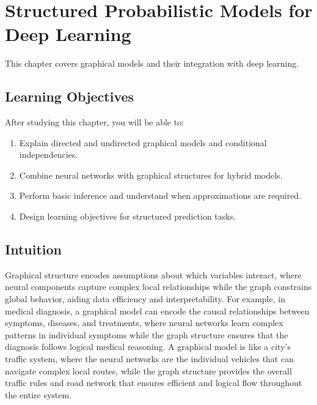 
\chapter{Structured Probabilistic Models for Deep Learning}
\label{chap:structured-probabilistic-models}

This chapter covers graphical models and their integration with deep learning.


\section*{Learning Objectives}

After studying this chapter, you will be able to:

\begin{enumerate}
    \item Explain directed and undirected graphical models and conditional independencies.
    \item Combine neural networks with graphical structures for hybrid models.
    \item Perform basic inference and understand when approximations are required.
    \item Design learning objectives for structured prediction tasks.
\end{enumerate}



\section*{Intuition}

Graphical structure encodes assumptions about which variables interact, where neural components capture complex local relationships while the graph constrains global behavior, aiding data efficiency and interpretability. For example, in medical diagnosis, a graphical model can encode the causal relationships between symptoms, diseases, and treatments, where neural networks learn complex patterns in individual symptoms while the graph structure ensures that the diagnosis follows logical medical reasoning. A graphical model is like a city's traffic system, where the neural networks are the individual vehicles that can navigate complex local routes, while the graph structure provides the overall traffic rules and road network that ensures efficient and logical flow throughout the entire system.










